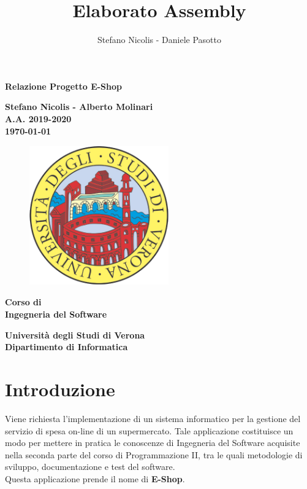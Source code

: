 \documentclass[12pt]{article}
\title{Elaborato Assembly}
\author{Stefano Nicolis - Daniele Pasotto}
\begin{document}
\begin{titlepage}
   \begin{center}
       \vspace*{1cm}
 
	\large

      {\huge \textbf{Relazione Progetto E-Shop} }
 
       \vspace{1.5cm}
 
       \textbf{Stefano Nicolis - Alberto Molinari}\\
	\textbf{A.A. 2019-2020}\\
	\vspace{0.35cm}
	\textbf{\today}

\vfill
\begin{figure}[h!]
	\begin{center}
	  \includegraphics[height=6cm, width=6cm]{media/logounivr}
	\end{center}
\end{figure}
 
	\vfill
 	\textbf{Corso di\\
       Ingegneria del Software\\}
 
       \vspace{3cm}
 
      \begin{multicols}{2}
      \textbf{Università degli Studi di Verona\\
	 Dipartimento di Informatica}
	\end{multicols}
 
   \end{center}
\end{titlepage}


\tableofcontents

\section{Introduzione}
Viene richiesta l'implementazione di un sistema informatico per la gestione del servizio di spesa on-line di un supermercato. Tale applicazione costituisce un modo per mettere in pratica le conoscenze di Ingegneria del Software acquisite nella seconda parte del corso di Programmazione II, tra le quali metodologie di sviluppo, documentazione e test del software.
\\
Questa applicazione prende il nome di \textbf{E-Shop}.
\end{document}
